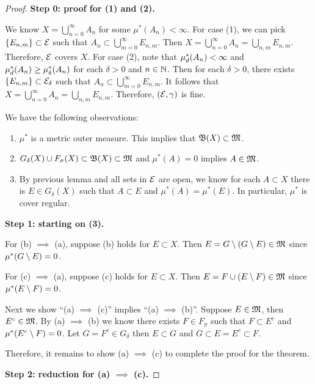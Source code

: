 \documentclass[a4paper]{article}
\renewcommand{\cupinfn}{\bigcup_{n=0}^\infty}
\begin{document}
\begin{proof}

  \textbf{Step 0: proof for (1) and (2).}

  We know $X = \cupinfn A_n$ for some $\mu^* (A_n) < \infty$. For case
  (1), we can pick $\left\{ E_{n, m} \right\} \subset \mathcal{E}$ such that
  $A_n \subset \bigcup_{m=0}^\infty E_{n, m}$. Then $X = \cupinfn A_n =
  \bigcup_{n, m} E_{n, m}$. Therefore, $\mathcal{E}$ covers $X$. For case (2),
  note that $\mu^*_d(A_n) < \infty$ and $\mu^*_d(A_n) \geq \mu^*_\delta(A_n)$
  for each $\delta > 0$ and $n \in \mathbb{N}$. Then for each $\delta > 0$, there
  exists $\left\{ E_{n, m} \right\} \subset \mathcal{E}_\delta$ such that $A_n
  \subset \bigcup_{m=0}^\infty E_{n, m}$. It follows that $X = \cupinfn
  A_n = \bigcup_{n, m} E_{n, m}$. Therefore, $(\mathcal{E}, \gamma)$ is fine.

  We have the following observations:
  \begin{enumerate}
    \item $\mu^*$ is a metric outer measure. This implies that
          $\mathfrak{B}(X) \subset \mathfrak{M}$.
    \item $G_\delta(X) \cup F_\sigma(X) \subset \mathfrak{B}(X) \subset \mathfrak{M}$
          and $\mu^*(A) = 0$ implies $A \in \mathfrak{M}$.
    \item By previous lemma and all sets in $\mathcal{E}$ are open, we know for
          each $A \subset X$ there is $E \in G_\delta(X)$ such that $A
          \subset E$ and $\mu^*(A) = \mu^*(E)$. In particular, $\mu^*$ is
          cover regular.
  \end{enumerate}

  \textbf{Step 1: starting on (3).}

  For (b) $\implies$ (a), suppose (b) holds for $E \subset X$. Then $E = G
  \setminus (G \setminus E) \in \mathfrak{M}$ since $\mu^*(G \setminus E) = 0$.

  For (c) $\implies$ (a), suppose (c) holds for $E \subset X$. Then $E = F
  \cup (E \setminus F) \in \mathfrak{M}$ since $\mu^*(E \setminus F) = 0$.

  Next we show ``(a) $\implies$ (c)'' implies ``(a) $\implies$ (b)''.
  Suppose $E \in \mathfrak{M}$, then $E^c \in \mathfrak{M}$. By (a) $\implies$ (b) we know
  there exists $F \in F_\sigma$ such that $F \subset E^c$ and $\mu^*(E^c
  \setminus F) = 0$. Let $G = F^c \in G_\delta$ then $E \subset G$ and $G
  \subset E = E^c \subset F$.

  Therefore, it remains to show (a) $\implies$ (c) to complete the proof
  for the theorem.

  \textbf{Step 2: reduction for (a) $\implies$ (c).}


\end{proof}
\end{document}

